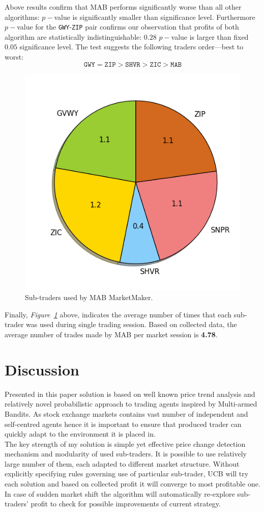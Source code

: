 \documentclass{llncs}
\begin{document}
Above results confirm that MAB performs significantly worse than all other algorithms: $p-$value is significantly smaller than significance level. Furthermore $p-$value for the \texttt{GWY}-\texttt{ZIP} pair confirms our observation that profits of both algorithm are statistically indistinguishable: $0.28$ $p-$value is larger than fixed $0.05$ significance level. The test suggests the following traders order---best to worst:\\
$$
\mathtt{GWY} = \mathtt{ZIP} > \mathtt{SHVR} > \mathtt{ZIC} > \mathtt{MAB}
$$

\begin{figure}[ht]
  \centering
  \includegraphics[width=.5\textwidth]{fig/pie.png}
  \caption{Sub-traders used by MAB MarketMaker.\label{fig:MABalgo}}
\end{figure}

Finally, \emph{Figure~\ref{fig:MABalgo}} above, indicates the average number of times that each sub-trader was used during single trading session. Based on collected data, the average number of trades made by MAB per market session is \textbf{4.78}.\\



\section{Discussion}
Presented in this paper solution is based on well known price trend analysis and relatively novel probabilistic approach to trading agents inspired by Multi-armed Bandits. As stock exchange markets contains vast number of independent and self-centred agents hence it is important to ensure that produced trader can quickly adapt to the environment it is placed in.\\
The key strength of my solution is simple yet effective price change detection mechanism and modularity of used sub-traders. It is possible to use relatively large number of them, each adapted to different market structure. Without explicitly specifying rules governing use of particular sub-trader, UCB will try each solution and based on collected profit it will converge to most profitable one. In case of sudden market shift the algorithm will automatically re-explore sub-traders' profit to check for possible improvements of current strategy.\\
\end{document}
